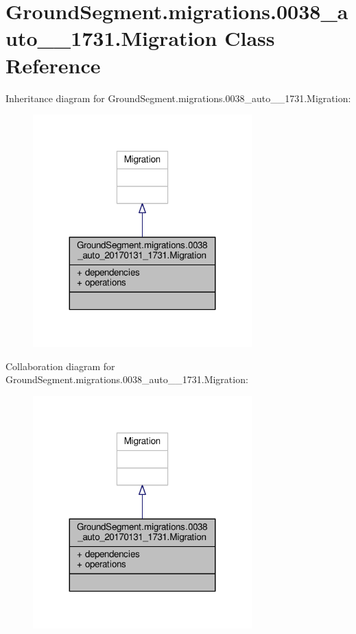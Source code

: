\hypertarget{class_ground_segment_1_1migrations_1_10038__auto__20170131__1731_1_1_migration}{}\section{Ground\+Segment.\+migrations.0038\+\_\+auto\+\_\+\_\+1731.Migration Class Reference}
\label{class_ground_segment_1_1migrations_1_10038__auto__20170131__1731_1_1_migration}


Inheritance diagram for Ground\+Segment.\+migrations.0038\+\_\+auto\+\_\+\_\+1731.Migration\+:\nopagebreak
\begin{figure}[H]
\begin{center}
\leavevmode
\includegraphics[width=239pt]{class_ground_segment_1_1migrations_1_10038__auto__20170131__1731_1_1_migration__inherit__graph}
\end{center}
\end{figure}


Collaboration diagram for Ground\+Segment.\+migrations.0038\+\_\+auto\+\_\+\_\+1731.Migration\+:\nopagebreak
\begin{figure}[H]
\begin{center}
\leavevmode
\includegraphics[width=239pt]{class_ground_segment_1_1migrations_1_10038__auto__20170131__1731_1_1_migration__coll__graph}
\end{center}
\end{figure}
